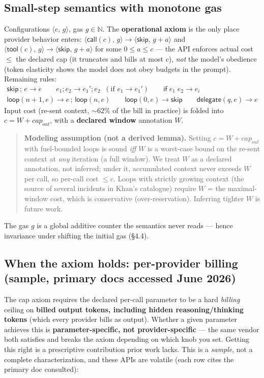\documentclass[11pt]{article}
\theoremstyle{plain}
\newcommand{\kw}[1]{\mathsf{#1}}                      %
\newcommand{\cfg}[2]{\langle #1,\, #2\rangle}          %
\begin{document}
\subsection{Small-step semantics with monotone gas}

Configurations $\cfg{e}{g}$, gas $g \in \mathbb{N}$. The \textbf{operational axiom} is the only
place provider behavior enters: $\cfg{\kw{call}(c)}{g} \to \cfg{\kw{skip}}{g + a}$ and
$\cfg{\kw{tool}(c)}{g} \to \cfg{\kw{skip}}{g + a}$ for some $0 \le a \le c$ --- the API enforces
actual cost $\le$ the declared cap (it truncates and bills at most $c$), \emph{not} the model's
obedience (token elasticity shows the model does not obey budgets in the prompt). Remaining rules:
\[
\begin{gathered}
\kw{skip} \,;\, e \to e
\qquad
e_1 ; e_2 \to e_1' ; e_2 \;\;(\text{if } e_1 \to e_1')
\qquad
\kw{if}\; e_1\; e_2 \to e_i
\\[2pt]
\kw{loop}(n+1, e) \to e \,;\, \kw{loop}(n, e)
\qquad
\kw{loop}(0, e) \to \kw{skip}
\qquad
\kw{delegate}(q, e) \to e
\end{gathered}
\]
Input cost (re-sent context, $\sim$62\% of the bill in practice) is folded into
$c = W + \mathit{cap}_{\mathit{out}}$, with a \textbf{declared window} annotation $W$.

\begin{quote}
\textbf{Modeling assumption (not a derived lemma).} Setting $c = W + \mathit{cap}_{\mathit{out}}$
with fuel-bounded loops is sound \emph{iff} $W$ is a worst-case bound on the re-sent context at
\emph{any} iteration (a full window). We treat $W$ as a declared annotation, not inferred; under
it, accumulated context never exceeds $W$ per call, so per-call cost $\le c$. Loops with strictly
growing context (the source of several incidents in Khan's catalogue) require $W$ = the
maximal-window cost, which is conservative (over-reservation). Inferring tighter $W$ is future
work.
\end{quote}

The gas $g$ is a global additive counter the semantics never reads --- hence invariance under
shifting the initial gas (\S4.4).

\subsection{When the axiom holds: per-provider billing (sample, primary docs accessed June 2026)}

The cap axiom requires the declared per-call parameter to be a hard \emph{billing} ceiling on
\textbf{billed output tokens, including hidden reasoning/thinking tokens} (which every provider
bills as output). Whether a given parameter achieves this is \textbf{parameter-specific, not
provider-specific} --- the same vendor both satisfies and breaks the axiom depending on which knob
you set. Getting this right is a prescriptive contribution prior work lacks. This is a
\emph{sample}, not a complete characterization, and these APIs are volatile (each row cites the
primary doc consulted):
\end{document}
